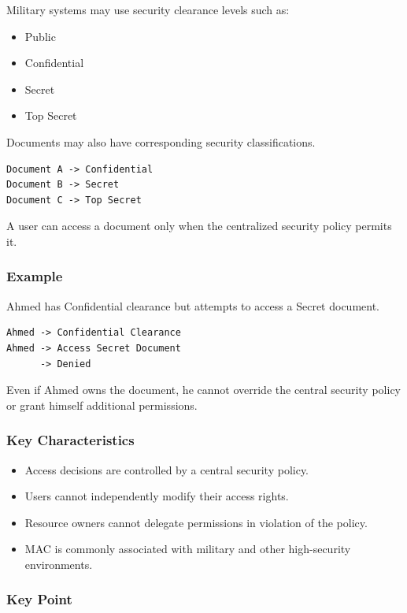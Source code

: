 \documentclass[11pt,a4paper]{article}
\begin{document}
Military systems may use security clearance levels such as:
\begin{itemize}
    \item Public
    \item Confidential
    \item Secret
    \item Top Secret
\end{itemize}

Documents may also have corresponding security classifications.

\begin{lstlisting}
Document A -> Confidential
Document B -> Secret
Document C -> Top Secret
\end{lstlisting}

A user can access a document only when the centralized security policy permits it.

\subsubsection{Example}

Ahmed has Confidential clearance but attempts to access a Secret document.

\begin{lstlisting}
Ahmed -> Confidential Clearance
Ahmed -> Access Secret Document
      -> Denied
\end{lstlisting}

Even if Ahmed owns the document, he cannot override the central security policy or grant himself additional permissions.

\subsubsection{Key Characteristics}

\begin{itemize}
    \item Access decisions are controlled by a central security policy.
    \item Users cannot independently modify their access rights.
    \item Resource owners cannot delegate permissions in violation of the policy.
    \item MAC is commonly associated with military and other high-security environments.
\end{itemize}

\subsubsection{Key Point}
\end{document}
